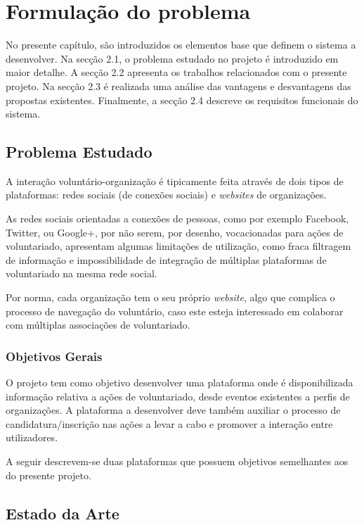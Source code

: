 \section{Formulação do problema}

No presente capítulo, são introduzidos os elementos base que definem o sistema a desenvolver. Na secção 2.1, o problema estudado no projeto é introduzido em maior detalhe. A secção 2.2 apresenta os trabalhos relacionados com o presente projeto. Na secção 2.3 é realizada uma análise das vantagens e desvantagens das propostas existentes. Finalmente, a secção 2.4 descreve os requisitos funcionais do sistema. \par \medskip

\subsection{Problema Estudado}
A interação voluntário-organização é tipicamente feita através de dois tipos de plataformas: redes sociais (de conexões sociais) e \textit{websites} de organizações. \medskip

As redes sociais orientadas a conexões de pessoas, como por exemplo Facebook, Twitter, ou Google+, por não serem, por desenho, vocacionadas para ações de voluntariado, apresentam algumas limitações de utilização, como fraca filtragem de informação e impossibilidade de integração de múltiplas plataformas de voluntariado na mesma rede social. \medskip

Por norma, cada organização tem o seu próprio \textit{website}, algo que complica o
processo de navegação do voluntário, caso este esteja interessado em colaborar com múltiplas associações de voluntariado. \medskip

\subsubsection{Objetivos Gerais}

O projeto tem como objetivo desenvolver uma plataforma onde é disponibilizada informação relativa a ações de voluntariado, desde eventos existentes a perfis de organizações. A plataforma a desenvolver deve também auxiliar o processo de candidatura/inscrição nas ações a levar a cabo e promover a interação entre utilizadores. \medskip

A seguir descrevem-se duas plataformas que possuem objetivos semelhantes aos do presente projeto. \medskip

\subsection{Estado da Arte}


